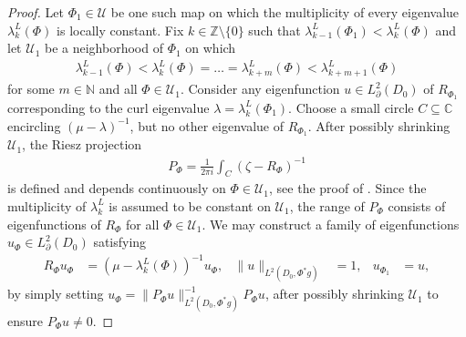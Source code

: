 \documentclass[11pt,reqno]{amsart}
\begin{document}
\begin{proof}
    Let $\Phi_1 \in \mathcal U$ be one such map on which the multiplicity of every eigenvalue $\lambda_k^L(\Phi)$ is locally constant. Fix $k \in \mathbb Z \setminus \{0\}$ such that $\lambda_{k-1}^L(\Phi_1) < \lambda_{k}^L(\Phi)$ and let $\mathcal U_1$ be a neighborhood of $\Phi_1$ on which
    \begin{align*}
        \lambda_{k-1}^L(\Phi) < \lambda_{k}^L(\Phi) = \ldots = \lambda_{k+m}^L(\Phi) < \lambda_{k+m+1}^L(\Phi)
    \end{align*}
    for some $m \in \mathbb N$ and all $\Phi \in \mathcal U_1$.
    Consider any eigenfunction $u \in L^2_\partial(D_0)$ of $R_{\Phi_1}$ corresponding to the curl eigenvalue $\lambda = \lambda_k^L(\Phi_1)$. Choose a small circle $C \subseteq \mathbb C$ encircling $(\mu - \lambda)^{-1}$, but no other eigenvalue of $R_{\Phi_1}$. After possibly shrinking $\mathcal U_1$, the Riesz projection
    \begin{align*}
        P_\Phi = \frac{1}{2\pi i} \int_{C} (\zeta - R_\Phi)^{-1}
    \end{align*}
    is defined and depends continuously on $\Phi \in \mathcal U_1$, see the proof of . Since the multiplicity of $\lambda_k^L$ is assumed to be constant on $\mathcal U_1$, the range of $P_\Phi$ consists of eigenfunctions of $R_\Phi$ for all $\Phi \in \mathcal U_1$. We may construct a family of eigenfunctions $u_\Phi \in L^2_\partial(D_0)$ satisfying
    \begin{align*}
        R_{\Phi} u_\Phi &= (\mu - \lambda_k^L(\Phi))^{-1} u_\Phi, & \|u\|_{L^2(D_0,\Phi^\ast g)} &= 1, & u_{\Phi_1} &= u,
    \end{align*}
    by simply setting $u_\Phi = \|P_\Phi u\|_{L^2(D_0,\Phi^\ast g)}^{-1} P_\Phi u$, after possibly shrinking $\mathcal U_1$ to ensure $P_\Phi u \neq 0$.


\end{proof}
\end{document}
